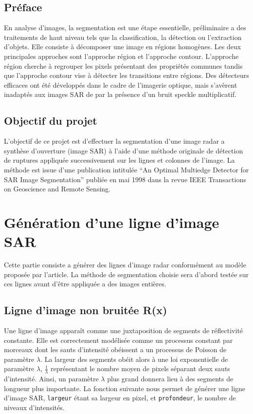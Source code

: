 \documentclass[a4paper,11pt]{article}
\begin{document}
\subsection{Préface}

En analyse d'images, la segmentation est une étape essentielle, préliminaire a des traitements de haut niveau tels que la classification, la détection ou l'extraction d'objets. Elle consiste à décomposer une image en régions homogènes. Les deux principales approches sont l'approche région et l'approche contour. L'approche région cherche à regrouper les pixels présentant des propriétés communes tandis que l'approche contour vise à détecter les transitions entre régions. Des détecteurs efficaces ont été développés dans le cadre de l'imagerie optique, mais s'avèrent inadaptés aux images SAR de par la présence d'un bruit speckle multiplicatif.

\subsection{Objectif du projet}

L'objectif de ce projet est d'effectuer la segmentation d'une image radar a synthèse
d'ouverture (image SAR) à l'aide d'une méthode originale de détection de
ruptures appliquée successivement sur les lignes et colonnes de l'image. La méthode
est issue d'une publication intitulée “An Optimal Multiedge Detector for SAR Image
Segmentation” publiée en mai 1998 dans la revue IEEE Transactions on Geoscience
and Remote Sensing.

\newpage

\section{Génération d'une ligne d'image SAR}

Cette partie consiste a générer des lignes d'image radar conformément au
modèle proposée par l'article. La méthode de segmentation choisie sera
d'abord testée sur ces lignes avant d'être appliquée a des images entières.

\subsection{Ligne d'image non bruitée R(x)}

Une ligne d'image apparaît comme une juxtaposition de segments de réflectivité constante.
Elle est correctement modélisée comme un processus constant par morceaux dont les
sauts d'intensité obéissent a un processus de Poisson de paramètre $\lambda$. La
largeur des segments obéit alors à une loi exponentielle de paramètre $\lambda$, $\frac{1}{\lambda}$ représentant
le nombre moyen de pixels séparant deux sauts d'intensité. Ainsi, un paramètre
${\lambda}$ plus grand donnera lieu à des segments de longueur plus importante. La fonction suivante
nous permet de générer une ligne d'image SAR, \texttt{largeur} étant sa largeur
en pixel, et \texttt{profondeur}, le nombre de niveaux d'intensités.
\end{document}
